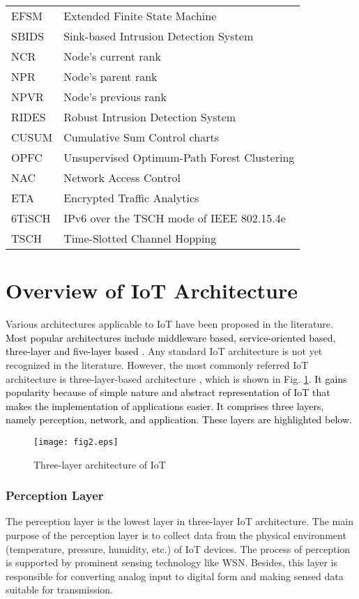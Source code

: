 \documentclass[10pt,journal,sort & compress]{IEEEtran}
\begin{document}
\begin{table}[]
\begin{tabular}{ll}
		EFSM & Extended Finite State Machine \\
		SBIDS & Sink-based Intrusion Detection System \\
		NCR & Node's current rank \\
		NPR & Node's parent rank \\
		NPVR & Node's previous rank \\
		RIDES & Robust Intrusion Detection System \\
		CUSUM & Cumulative Sum Control charts \\
		OPFC & Unsupervised Optimum-Path Forest Clustering \\
		NAC & Network Access Control \\
		ETA & Encrypted Traffic Analytics \\
		6TiSCH & IPv6 over the TSCH mode of IEEE 802.15.4e \\
		TSCH & Time-Slotted Channel Hopping
	\end{tabular}
\end{table}


\section{Overview of IoT Architecture}\label{Basics of Internet of Things}

Various architectures applicable to IoT have been proposed in the literature. \textcolor{black}{Most popular architectures include middleware based, service-oriented based, three-layer and five-layer based \cite{sethi2017internet}.} Any standard IoT architecture is not yet recognized in the literature. However, the most commonly referred IoT architecture is three-layer-based architecture \cite{Abdmeziem2016}, which is shown in Fig. \ref{3LayeredArchitecture}. \textcolor{black}{It gains popularity because of simple nature and abstract representation of IoT that makes the implementation of applications easier. It comprises three layers, namely perception, network, and application. These layers are highlighted below.}

\begin{figure}[!h]
	\centering
	\texttt{[image: fig2.eps]}
	\caption{Three-layer architecture of IoT}
	\label{3LayeredArchitecture}
\end{figure}

\subsubsection{Perception Layer}
The perception layer is the lowest layer in three-layer IoT architecture. The main purpose of the perception layer is to collect data from the physical environment (temperature, pressure, humidity, etc.) of IoT devices. The process of perception is supported by prominent sensing technology like WSN. Besides, this layer is responsible for converting analog input to digital form and making sensed data suitable for transmission.
\end{document}
